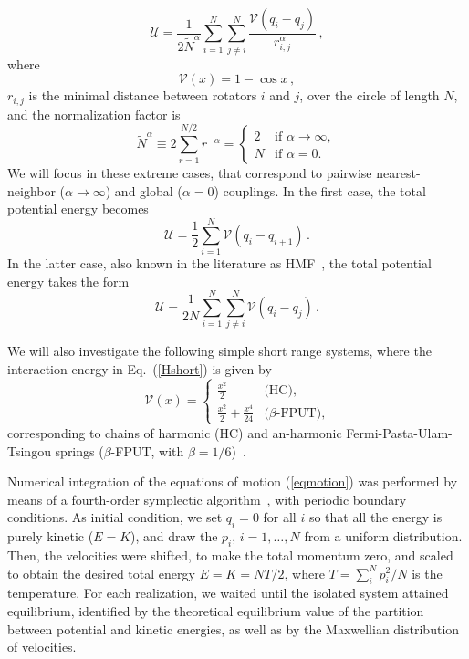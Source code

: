 \documentclass[aps,pre,showpacs,twocolumn,superscriptaddress,floatfix]{revtex4-1}
\begin{document}
\begin{equation}
  \mathcal{U}  =
  \frac{1}{2 \widetilde{N}^\alpha}  \sum_{i=1}^N  \sum_{j \neq i}^N   
	\frac{\mathcal{V} (q_i - q_j)}{r_{i,j}^\alpha} \,,
\label{Halfa}
\end{equation}
%
where 
%
\begin{equation}
\mathcal{V}(x)=1-\cos x \,,  
\end{equation}
%
$r_{i,j}$ is the minimal distance 
between rotators $i$ and $j$, over the circle of length $N$, and the normalization factor is   
\begin{equation}
 \widetilde{N}^\alpha \equiv 2 \sum_{r=1}^{N/2} r^{-\alpha} = %
 \begin{cases}
   2 &\text{if $\alpha \to \infty$}, \\
   N &\text{if $\alpha = 0$}.
 \end{cases}
\end{equation}
%
We will focus in these extreme cases, that correspond to pairwise nearest-neighbor ($\alpha\to\infty$) 
and global ($\alpha=0$) couplings. 
% 
In the first case, the total potential  energy becomes
%
\begin{equation}
  \mathcal{U}  = \frac{1}{2} \sum_{i=1}^N   \mathcal{V}(q_i - q_{i+1})  \,.
\label{Hshort}
\end{equation}
%
In the latter case, also known in the literature as HMF~\cite{AntoniRuffo1995PRE}, 
the total potential energy takes the form
%
 \begin{equation}
  \mathcal{U}  =
  \frac{1}{2  N}  \sum_{i=1}^N  \sum_{j \neq i}^N {\mathcal{V}(q_i - q_j)} \,.
\label{Hlong}
\end{equation}
 
  
We will also investigate the following simple short 
range systems, where the interaction energy in Eq.~(\ref{Hshort}) is given by 
%   
\begin{equation}
 \mathcal{V}(x) = 
 \begin{cases}
  \frac{x^2}{2}  &\text{(HC),} \\[2mm]
  \frac{x^2}{2}+ \frac{x^4}{24}  &\text{($\beta$-FPUT),}  
 \end{cases}
 \label{eq:Potentials}
\end{equation}
%
corresponding to  chains of harmonic (HC) and  an-harmonic Fermi-Pasta-Ulam-Tsingou   springs
($\beta$-FPUT, with $\beta=1/6$)~\cite{BermanIzrailev2005Report,Dauxois2008PhysToday}.
%

	
Numerical integration of the equations of motion (\ref{eqmotion}) was 
performed by means of a fourth-order symplectic algorithm~\cite{Yoshida1990}, 
 with periodic boundary conditions. 
%
As initial condition, we set $q_i = 0$ for all $i$ so that all the energy is purely kinetic ($E=K$), 
and draw the $p_i$, $i=1,\ldots,N$  from a uniform distribution. Then, the 
velocities were shifted, to make the total momentum zero, and scaled 
to obtain the desired total energy $E=K=N T/2$, where $T=\sum_i^N p_i^2/N$ is the temperature. 
%
For each realization, we waited until the isolated system attained equilibrium, 
identified by the theoretical equilibrium value of the partition between potential and kinetic energies, 
as well as by  the Maxwellian distribution of velocities. 
 
\end{document}
